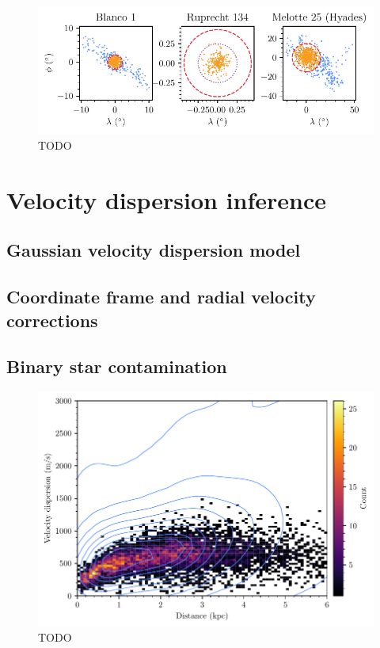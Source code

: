 \begin{figure}[t]
    \centering
    \includegraphics[width=\textwidth]{fig/c4/masses_jacobi_radii.pdf}
    \caption[TODO]{TODO}
    \label{fig:dynamics:masses:radii}
 \end{figure}



\section{Velocity dispersion inference}
\label{sec:dynamics:velocities}


\subsection{Gaussian velocity dispersion model}
\label{sec:dynamics:velocities:model}


\subsection{Coordinate frame and radial velocity corrections}
\label{sec:dynamics:velocities:correction}


\subsection{Binary star contamination}
\label{sec:dynamics:velocities:binaries}

\begin{figure}[t]
    \centering
    \includegraphics[width=\textwidth]{fig/c4/dispersion_binaries.pdf}
    \caption[TODO]{TODO}
    \label{fig:dynamics:velocities:binary_contamination}
 \end{figure}


